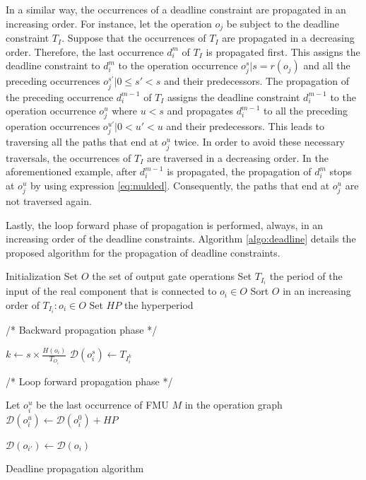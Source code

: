 In a similar way, the occurrences of a deadline constraint are propagated in an increasing order. For instance, let the operation $o_j$ be subject to the deadline constraint $T_I$. Suppose that the occurrences of $T_I$ are propagated in a decreasing order. Therefore, the last occurrence $d_i^m$ of $T_I$ is propagated first. This assigns the deadline constraint to $d_i^m$ to the operation occurrence $o_j^s | s = r(o_j)$ and all the preceding occurrences $o_j^{s'} | 0 \leq s' < s $ and their predecessors. The propagation of the preceding occurrence $d_i^{m-1}$ of $T_I$ assigns the deadline constraint $d_i^{m-1}$ to the operation occurrence $o_j^u$ where $u < s$ and propagates $d_i^{m-1}$ to all the preceding operation occurrences $o_j^{u'} | 0 < u' < u $ and their predecessors. This leads to traversing all the paths that end at $o_j^u$ twice. In order to avoid these necessary traversals, the occurrences of $T_I$ are traversed in a decreasing order. In the aforementioned example, after $d_i^{m-1}$ is propagated, the propagation of $d_i^m$ stops at $o_j^u$ by using expression \ref{eq:mulded}. Consequently, the paths that end at $o_j^u$ are not traversed again.

Lastly, the loop forward phase of propagation is performed, always, in an increasing order of the deadline constraints. Algorithm \ref{algo:deadline} details the proposed algorithm for the propagation of deadline constraints.

\begin{algorithm}[!htp]	
	 Initialization\;
	 Set $O$ the set of output gate operations\;
	 Set $T_{I_i}$ the period of the input of the real component that is connected to $o_i \in O$\;
	 Sort $O$ in an increasing order of $T_{I_i}: o_i \in O$\;
	 Set $HP$ the hyperperiod\;
	
	/* Backward propagation phase */
	
	{
		{
		  $k \leftarrow s \times \frac{H(o_i)}{T_{O_i}}$\;
			$\mathcal{D}(o_i^s) \leftarrow T_{I_i^k}$\;
			\;	
		}
	}
	
	/* Loop forward propagation phase */
	
	{
		  Let $o_i^u$ be the last occurrence of FMU $M$ in the operation graph\;
			$\mathcal{D}(o_i^u) \leftarrow \mathcal{D}(o_i^0) + HP$\;
			\;	
	}
		
		{
			{
				{
					$\mathcal{D}(o_{i'}) \leftarrow \mathcal{D}(o_i)$\;
					\;
				}
			}
			\KwRet\;
		}
	\caption{Deadline propagation algorithm}
	\label{algo:deadline}
\end{algorithm}   



